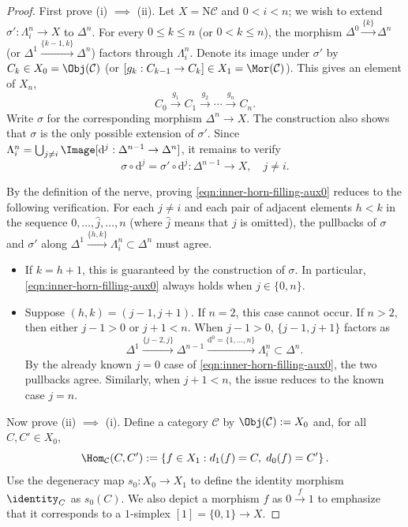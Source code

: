 \begin{proof}
	First prove (i) $\implies$ (ii). Let $X=\mathrm{N}\mathcal{C}$ and
	$0<i<n$; we wish to extend $\sigma':\Lambda^n_i\to X$ to $\Delta^n$.
	For every $0\leq k\leq n$ (or $0<k\leq n$), the morphism
	$\Delta^0\xrightarrow{\{k\}}\Delta^n$ (or
	$\Delta^1\xrightarrow{\{k-1,k\}}\Delta^n$) factors through
	$\Lambda^n_i$. Denote its image under $\sigma'$ by
	$C_k\in X_0=\Obj(\mathcal{C})$ (or
	$[g_k:C_{k-1}\to C_k]\in X_1=\Mor(\mathcal{C})$). This gives an element
	of $X_n$,
	\[ C_0 \xrightarrow{g_1} C_1 \xrightarrow{g_2} \cdots \xrightarrow{g_n} C_n. \]
	Write $\sigma$ for the corresponding morphism $\Delta^n\to X$. The
	construction also shows that $\sigma$ is the only possible extension of
	$\sigma'$. Since
	$\Lambda^n_i=\bigcup_{j\neq i}\Image[\mathrm{d}^j:
	\Delta^{n-1}\to\Delta^n]$, it remains to verify
	\begin{equation}\label{eqn:inner-horn-filling-aux0}
		\sigma \circ \mathrm{d}^j = \sigma' \circ \mathrm{d}^j : \Delta^{n-1} \to X, \quad j \neq i .
	\end{equation}

	By the definition of the nerve, proving
	\eqref{eqn:inner-horn-filling-aux0} reduces to the following verification.
	For each $j\neq i$ and each pair of adjacent elements $h<k$ in the
	sequence $0,\ldots,\widehat{j},\ldots,n$ (where $\widehat{j}$ means that
	$j$ is omitted), the pullbacks of $\sigma$ and $\sigma'$ along
	$\Delta^1\xrightarrow{\{h,k\}}\Lambda^n_i\subset\Delta^n$ must agree.
	\begin{itemize}
		\item If $k=h+1$, this is guaranteed by the construction of $\sigma$.
		In particular, \eqref{eqn:inner-horn-filling-aux0} always holds when
		$j\in\{0,n\}$.
		\item Suppose $(h,k)=(j-1,j+1)$. If $n=2$, this case cannot occur. If
		$n>2$, then either $j-1>0$ or $j+1<n$. When $j-1>0$,
		$\{j-1,j+1\}$ factors as
		\[ \Delta^1 \xrightarrow{\{j-2, j\}} \Delta^{n-1} \xrightarrow{\mathrm{d}^0 = \{1, \ldots, n\}} \Lambda^n_i \subset \Delta^n. \]
		By the already known $j=0$ case of
		\eqref{eqn:inner-horn-filling-aux0}, the two pullbacks agree. Similarly,
		when $j+1<n$, the issue reduces to the known case $j=n$.
	\end{itemize}

	Now prove (ii) $\implies$ (i). Define a category $\mathcal{C}$ by
	$\Obj(\mathcal{C}):=X_0$ and, for all $C,C'\in X_0$,
	\[ \Hom_{\mathcal{C}}(C, C') := \left\{ f \in X_1: d_1(f) = C, \; d_0(f) = C' \right\}. \]
	Use the degeneracy map $s_0:X_0\to X_1$ to define the identity morphism
	$\identity_C$ as $s_0(C)$. We also depict a morphism $f$ as
	$0\xrightarrow{f}1$ to emphasize that it corresponds to a $1$-simplex
	$[1]=\{0,1\}\to X$.


\end{proof}
